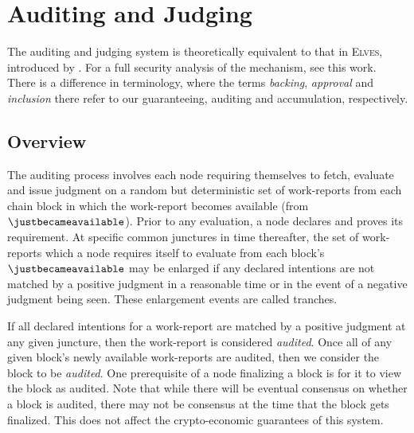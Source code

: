 \section{Auditing and Judging}\label{sec:auditing}

The auditing and judging system is theoretically equivalent to that in \textsc{Elves}, introduced by \cite{cryptoeprint:2024/961}. For a full security analysis of the mechanism, see this work. There is a difference in terminology, where the terms \emph{backing}, \emph{approval} and \emph{inclusion} there refer to our guaranteeing, auditing and accumulation, respectively.


\subsection{Overview}

The auditing process involves each node requiring themselves to fetch, evaluate and issue judgment on a random but deterministic set of work-reports from each \Jam chain block in which the work-report becomes available (\ie from $\justbecameavailable$). Prior to any evaluation, a node declares and proves its requirement. At specific common junctures in time thereafter, the set of work-reports which a node requires itself to evaluate from each block's $\justbecameavailable$ may be enlarged if any declared intentions are not matched by a positive judgment in a reasonable time or in the event of a negative judgment being seen. These enlargement events are called tranches.

If all declared intentions for a work-report are matched by a positive judgment at any given juncture, then the work-report is considered \emph{audited}. Once all of any given block's newly available work-reports are audited, then we consider the block to be \emph{audited}. One prerequisite of a node finalizing a block is for it to view the block as audited. Note that while there will be eventual consensus on whether a block is audited, there may not be consensus at the time that the block gets finalized. This does not affect the crypto-economic guarantees of this system.

